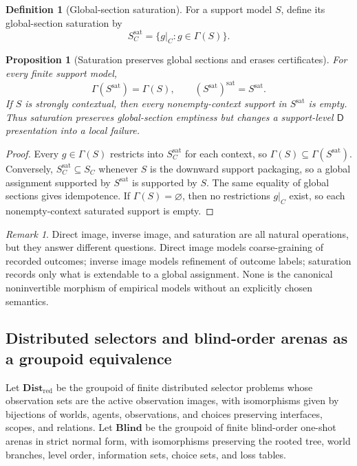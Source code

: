 \documentclass[11pt]{article}
\theoremstyle{plain}
\newtheorem{proposition}[theorem]{Proposition}
\theoremstyle{definition}
\newtheorem{definition}[theorem]{Definition}
\theoremstyle{remark}
\newtheorem{remark}[theorem]{Remark}
\begin{document}
\begin{definition}[Global-section saturation]
\label{def:empirical-saturation}
For a support model $S$, define its global-section saturation by
\[
S_C^{\mathrm{sat}}=\{g|_C:g\in\Gamma(S)\}.
\]
\end{definition}

\begin{proposition}[Saturation preserves global sections and erases certificates]
\label{prop:empirical-saturation}
For every finite support model,
\[
\Gamma(S^{\mathrm{sat}})=\Gamma(S),
\qquad
(S^{\mathrm{sat}})^{\mathrm{sat}}=S^{\mathrm{sat}}.
\]
If $S$ is strongly contextual, then every nonempty-context support in
$S^{\mathrm{sat}}$ is empty. Thus saturation preserves global-section emptiness
but changes a support-level $\mathsf D$ presentation into a local failure.
\end{proposition}

\begin{proof}
Every $g\in\Gamma(S)$ restricts into $S_C^{\mathrm{sat}}$ for each context, so
$\Gamma(S)\subseteq\Gamma(S^{\mathrm{sat}})$. Conversely,
$S_C^{\mathrm{sat}}\subseteq S_C$ whenever $S$ is the downward support packaging,
so a global assignment supported by $S^{\mathrm{sat}}$ is supported by $S$. The
same equality of global sections gives idempotence. If $\Gamma(S)=\varnothing$,
then no restrictions $g|_C$ exist, so each nonempty-context saturated support is
empty.
\end{proof}

\begin{remark}
Direct image, inverse image, and saturation are all natural operations, but they
answer different questions. Direct image models coarse-graining of recorded
outcomes; inverse image models refinement of outcome labels; saturation records
only what is extendable to a global assignment. None is the canonical
noninvertible morphism of empirical models without an explicitly chosen
semantics.
\end{remark}

\subsection{Distributed selectors and blind-order arenas as a groupoid equivalence}

Let $\mathbf{Dist}_{\mathrm{red}}$ be the groupoid of finite distributed selector
problems whose observation sets are the active observation images, with
isomorphisms given by bijections of worlds, agents, observations, and choices
preserving interfaces, scopes, and relations. Let $\mathbf{Blind}$ be the
groupoid of finite blind-order one-shot arenas in strict normal form, with
isomorphisms preserving the rooted tree, world branches, level order,
information sets, choice sets, and loss tables.
\end{document}
